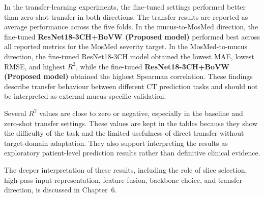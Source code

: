 In the transfer-learning experiments, the fine-tuned settings performed better than zero-shot transfer in both directions. The transfer results are reported as average performance across the five folds. In the mucus-to-MosMed direction, the fine-tuned \textbf{ResNet18-3CH+BoVW (Proposed model)} performed best across all reported metrics for the MosMed severity target. In the MosMed-to-mucus direction, the fine-tuned ResNet18-3CH model obtained the lowest MAE, lowest RMSE, and highest \(R^2\), while the fine-tuned \textbf{ResNet18-3CH+BoVW (Proposed model)} obtained the highest Spearman correlation. These findings describe transfer behaviour between different CT prediction tasks and should not be interpreted as external mucus-specific validation.

Several \(R^2\) values are close to zero or negative, especially in the baseline and zero-shot transfer settings. These values are kept in the tables because they show the difficulty of the task and the limited usefulness of direct transfer without target-domain adaptation. They also support interpreting the results as exploratory patient-level prediction results rather than definitive clinical evidence.

The deeper interpretation of these results, including the role of slice selection, high-pass input representation, feature fusion, backbone choice, and transfer direction, is discussed in Chapter~6.
